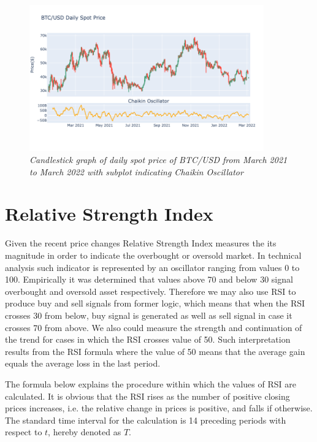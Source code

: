 \begin{figure}[h]

\begin{center}
	\includegraphics[width=0.9\textwidth]{Chaikin.png}
\end{center}

\caption{\textit{ Candlestick graph of daily spot price of BTC/USD from March 2021 to March 2022 with subplot indicating Chaikin Oscillator}}

\end{figure}


\section{Relative Strength Index}

Given the recent price changes Relative Strength Index measures the its magnitude in order to indicate the overbought or oversold market. In technical analysis such indicator is represented by an oscillator ranging from values 0 to 100. Empirically 
it was determined that values above 70 and below 30 signal overbought and oversold asset respectively. Therefore we may also use RSI to produce buy and sell signals from former logic, which means that when the RSI crosses 30 from below, buy signal is generated as well as sell signal in case it crosses 70 from above. We also could measure the strength and continuation of the trend for cases in which the RSI crosses value of 50. Such interpretation results from the RSI formula where the value of 50 means that the average gain equals the average loss in the last period.

The formula below explains the procedure within which the values of RSI are calculated. It is obvious that the RSI rises as the number of positive closing prices increases, i.e. the relative change in prices is positive, and falls if otherwise. The standard time interval for  the calculation is 14 preceding periods with respect to $t$, hereby denoted as $T$.

